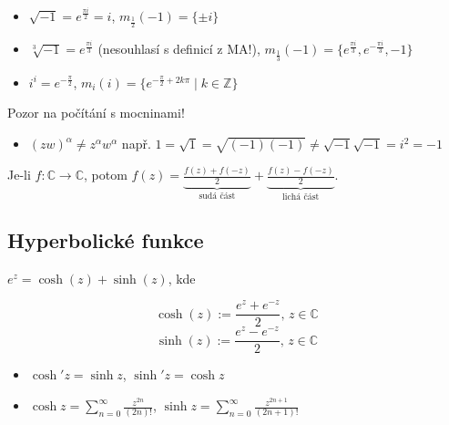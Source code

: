 \begin{example}
\begin{itemize}
    \item $\sqrt{-1}=e^{\frac{\pi i}{2}}=i$,  $m_{\frac{1}{2}}(-1)=\{\pm i\}$
    \item $\sqrt[3]{-1}=e^{\frac{\pi i}{3}}$ (nesouhlasí s definicí z MA!),  $m_{\frac{1}{3}}(-1)=\{e^{\frac{\pi i}{3}},e^{-\frac{\pi i}{3}},-1\} $
    \item  $i^i=e^{-\frac{\pi }{2}}$, 
    $m_{i}(i)=\{e^{-\frac{\pi }{2}+2k\pi}\mid k\in\mathbb{Z}\}$
\end{itemize}

 \vspace{5mm}
 Pozor na počítání s mocninami!%
 \begin{itemize}
    \item$(zw)^{\alpha}\neq z^{\alpha}w^{\alpha}$ \newline
 např. $1=\sqrt{1}=\sqrt{(-1)(-1)}\neq \sqrt{-1}\sqrt{-1}=i^2=-1$
 \end{itemize}
\end{example}

\begin{note}
Je-li $f \colon \mathbb{C} \to \mathbb{C}$, potom $f(z)=\underset{\text{sudá část}}{\underbrace{\frac{f(z)+f(-z)}{2}}}+\underset{\text{lichá část}}{\underbrace{\frac{f(z)-f(-z)}{2}}}$.
\end{note}

\subsection{Hyperbolické funkce}

$e^{z}=\cosh(z)+\sinh(z)$, kde

\begin{definition}
\[\cosh(z):=\frac{e^{z}+e^{-z}}{2}\text{, }z\in \mathbb{C}\] \newline
\[\sinh(z):=\frac{e^{z}-e^{-z}}{2}\text{, }z\in \mathbb{C}\]
\end{definition}


\begin{properties}
\mbox{}
\vspace{-2em}
\begin{itemize}
    \item $\cosh'{z}=\sinh{z}$, $\sinh'{z}=\cosh{z}$
    \item $\cosh{z}=\sum_{n=0}^{\infty}\frac{z^{2n}}{(2n)!}$, $\sinh{z}=\sum_{n=0}^{\infty}\frac{z^{2n+1}}{(2n+1)!}$
\end{itemize}
\end{properties}


